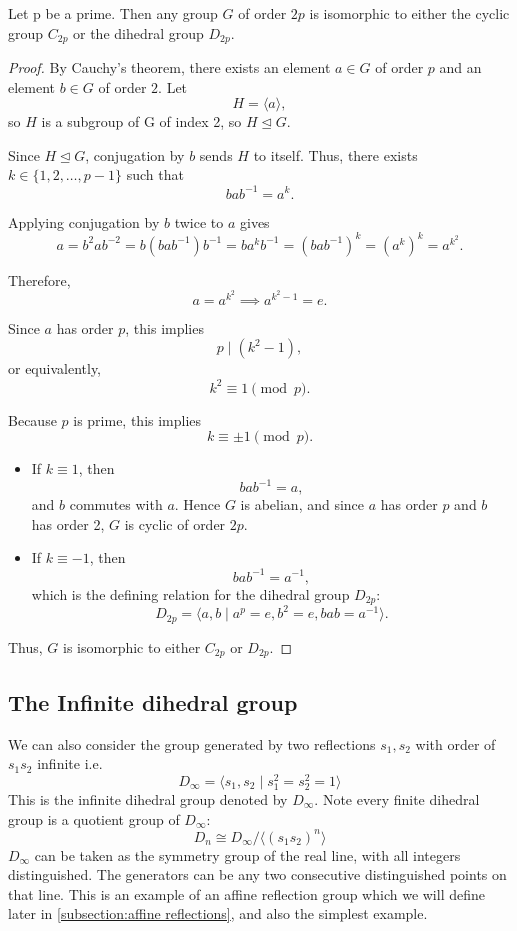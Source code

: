 \documentclass[../main.tex]{subfiles}
\begin{document}
\begin{theorem}
Let p be a prime. Then any group $G$ of order $2p$ is isomorphic to either the cyclic group $C_{2p}$ or the dihedral group $D_{2p}$.

\begin{proof}
By Cauchy's theorem, there exists an element \( a \in G \) of order $p$ and an element \( b \in G \) of order $2$. Let
\[
H = \langle a \rangle,
\]
so \( H \) is a subgroup of G of index 2, so \( H \trianglelefteq G \).

Since \( H \trianglelefteq G \), conjugation by \( b \) sends \( H \) to itself. Thus, there exists \( k \in \{1, 2, \ldots, p-1\} \) such that
\[
b a b^{-1} = a^k.
\]

Applying conjugation by \( b \) twice to \( a \) gives
\[
a = b^2 a b^{-2} = b (b a b^{-1}) b^{-1} = b a^k b^{-1} = (b a b^{-1})^k = (a^k)^k = a^{k^2}.
\]

Therefore,
\[
a = a^{k^2} \implies a^{k^2 - 1} = e.
\]

Since \( a \) has order \( p \), this implies
\[
p \mid (k^2 - 1),
\]
or equivalently,
\[
k^2 \equiv 1 \pmod p.
\]

Because \( p \) is prime, this implies
\[
k \equiv \pm 1 \pmod p.
\]

\begin{itemize}
\item If \( k \equiv 1 \), then
\[
b a b^{-1} = a,
\]
and \( b \) commutes with \( a \). Hence \( G \) is abelian, and since \( a \) has order \( p \) and \( b \) has order 2, \( G \) is cyclic of order \( 2p \).

\item If \( k \equiv -1 \), then
\[
b a b^{-1} = a^{-1},
\]
which is the defining relation for the dihedral group \( D_{2p} \):
\[
D_{2p} = \langle a, b \mid a^p = e, b^2 = e, b a b = a^{-1} \rangle.
\]
\end{itemize}

Thus, $G$ is isomorphic to either $C_{2p}$ or $D_{2p}$.
\end{proof}

\end{theorem}

\subsection{The Infinite dihedral group}

We can also consider the group generated by two reflections $s_1,s_2$ with order of $s_1s_2$ infinite i.e.
\[
D_\infty = \langle s_1, s_2 \mid s_1^2 = s_2^2 = 1 \rangle
\]
This is the infinite dihedral group denoted by $D_{\infty}$. Note every finite dihedral group is a quotient group of $D_{\infty}$: \[
D_n \cong D_{\infty} / \langle (s_1 s_2)^n \rangle
\]
 $D_{\infty}$ can be taken as the symmetry group of the real line, with all integers distinguished. The generators can be any two consecutive distinguished points on that line. This is an example of an affine reflection group which we will define later in \ref{subsection:affine reflections}, and also the simplest example. 
\end{document}
